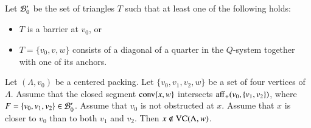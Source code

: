 \bigskip

%


Let ${\mathcal B}_0'$ be the set of triangles $T$ such that at least one
of the following holds:
\begin{itemize}
    \item $T$ is a barrier at $v_0$, or
    \item $T=\{v_0,v,w\}$ consists of a diagonal of a quarter in the
    $Q$-system together with one of its anchors.
\end{itemize}

\begin{lemma} 
Let $(\Lambda,v_0)$ be a centered packing.  Let $\{v_0,v_1,v_2,w\}$
be a set of four vertices of $\Lambda$. 
Assume that the closed segment
${\operatorname{conv}}\{x,w\}$ intersects ${\operatorname{aff}}_+(v_0,\{v_1,v_2\})$, where
$F = \{v_0,v_1,v_2\}\in {\mathcal B}'_0$. Assume that $v_0$ 
is not obstructed at $x$. Assume that $x$ is closer to $v_0$ 
than to both $v_1$ and $v_2$. Then $x\not\in{\operatorname{VC}}(\Lambda,w)$.
\end{lemma}


